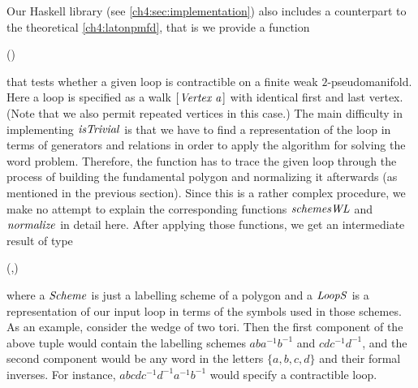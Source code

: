 \medskip
Our Haskell library (see \cref{ch4:sec:implementation}) also includes a
counterpart to the theoretical \cref{ch4:latonpmfd}, that is we provide
a function\begin{hscode}\SaveRestoreHook
{}%
%
%
\>[4]{}\mathbin{::}(\;)\Rightarrow {}\;\to {}\;\to {}\<[E]%
\ColumnHook
\end{hscode}\resethooks
that tests whether a given loop is contractible on a finite weak
$2$-pseudomanifold. Here a loop is specified as a walk \ensuremath{[\mskip1.5mu \Conid{Vertex}\;\Varid{a}\mskip1.5mu]} 
 with identical first and last vertex.
(Note that we also permit repeated vertices in this case.)
The main difficulty in implementing \ensuremath{\Varid{isTrivial}} is that we have
to find a representation of the loop in terms of generators and relations
in order to apply the algorithm for solving the word problem. Therefore,
the function has to trace the given loop through the process of building
the fundamental polygon and normalizing it afterwards (as mentioned in the
previous section). Since this is a rather complex procedure, we make no attempt
to explain the corresponding functions \ensuremath{\Varid{schemesWL}} and \ensuremath{\Varid{normalize}}
in detail here. After applying those functions, we get an intermediate
result of type \begin{hscode}\SaveRestoreHook
{}%
%
%
\>[3]{}(\;,){}\<[E]%
\ColumnHook
\end{hscode}\resethooks
where a \ensuremath{\Conid{Scheme}} is just a labelling scheme of a polygon and a \ensuremath{\Conid{LoopS}}
is a representation of our input loop in terms of the symbols used in those
schemes.
As an example, consider the wedge of two tori. Then the first component of the
above tuple would contain the labelling schemes $aba^{-1}b^{-1}$ and
$cdc^{-1}d^{-1}$, and the second component would be any word in the letters
$\{a,b,c,d\}$ and their formal inverses. For instance,
$abcdc^{-1}d^{-1}a^{-1}b^{-1}$ would specify a contractible loop.

